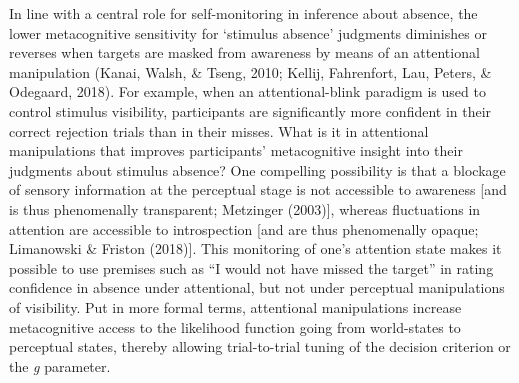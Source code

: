 \documentclass[12pt,twoside]{reedthesis}
\begin{document}
In line with a central role for self-monitoring in inference about absence, the lower metacognitive sensitivity for `stimulus absence' judgments diminishes or reverses when targets are masked from awareness by means of an attentional manipulation (Kanai, Walsh, \& Tseng, 2010; Kellij, Fahrenfort, Lau, Peters, \& Odegaard, 2018). For example, when an attentional-blink paradigm is used to control stimulus visibility, participants are significantly more confident in their correct rejection trials than in their misses. What is it in attentional manipulations that improves participants' metacognitive insight into their judgments about stimulus absence? One compelling possibility is that a blockage of sensory information at the perceptual stage is not accessible to awareness {[}and is thus phenomenally transparent; Metzinger (2003){]}, whereas fluctuations in attention are accessible to introspection {[}and are thus phenomenally opaque; Limanowski \& Friston (2018){]}. This monitoring of one's attention state makes it possible to use premises such as ``I would not have missed the target'' in rating confidence in absence under attentional, but not under perceptual manipulations of visibility. Put in more formal terms, attentional manipulations increase metacognitive access to the likelihood function going from world-states to perceptual states, thereby allowing trial-to-trial tuning of the decision criterion or the \emph{g} parameter.
\end{document}
